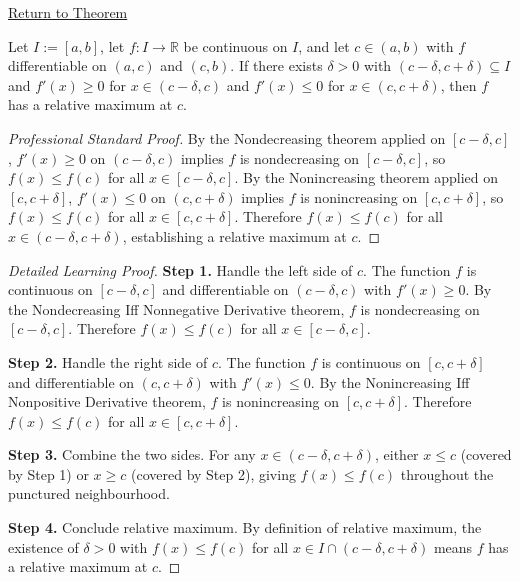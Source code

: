 \newpage
{}
\label{prf:first-derivative-test-maximum}

\begin{remark*}[Return]
\hyperref[thm:first-derivative-test-maximum]{Return to Theorem}
\end{remark*}

\begin{theorem*}
Let $I := [a,b]$, let $f : I \to \mathbb{R}$ be continuous on $I$, and let $c \in (a,b)$ with $f$ differentiable on $(a,c)$ and $(c,b)$. If there exists $\delta > 0$ with $(c-\delta,c+\delta) \subseteq I$ and $f'(x) \geq 0$ for $x \in (c-\delta,c)$ and $f'(x) \leq 0$ for $x \in (c,c+\delta)$, then $f$ has a relative maximum at $c$.
\end{theorem*}

\begin{proof}[Professional Standard Proof]
\LRAProofBodyStart
By the Nondecreasing theorem applied on $[c-\delta, c]$, $f'(x) \geq 0$ on $(c-\delta,c)$ implies $f$ is nondecreasing on $[c-\delta,c]$, so $f(x) \leq f(c)$ for all $x \in [c-\delta,c]$. By the Nonincreasing theorem applied on $[c,c+\delta]$, $f'(x) \leq 0$ on $(c,c+\delta)$ implies $f$ is nonincreasing on $[c,c+\delta]$, so $f(x) \leq f(c)$ for all $x \in [c,c+\delta]$. Therefore $f(x) \leq f(c)$ for all $x \in (c-\delta,c+\delta)$, establishing a relative maximum at $c$.
\end{proof}

\begin{proof}[Detailed Learning Proof]
\LRAProofBodyStart

\textbf{Step 1.} Handle the left side of $c$. The function $f$ is continuous on $[c-\delta,c]$ and differentiable on $(c-\delta,c)$ with $f'(x) \geq 0$. By the Nondecreasing Iff Nonneg\-ative Derivative theorem, $f$ is nondecreasing on $[c-\delta,c]$. Therefore $f(x) \leq f(c)$ for all $x \in [c-\delta,c]$.

\textbf{Step 2.} Handle the right side of $c$. The function $f$ is continuous on $[c,c+\delta]$ and differentiable on $(c,c+\delta)$ with $f'(x) \leq 0$. By the Nonincreasing Iff Nonpos\-itive Derivative theorem, $f$ is nonincreasing on $[c,c+\delta]$. Therefore $f(x) \leq f(c)$ for all $x \in [c,c+\delta]$.

\textbf{Step 3.} Combine the two sides. For any $x \in (c-\delta,c+\delta)$, either $x \leq c$ (covered by Step 1) or $x \geq c$ (covered by Step 2), giving $f(x) \leq f(c)$ throughout the punctured neighbourhood.

\textbf{Step 4.} Conclude relative maximum. By definition of relative maximum, the existence of $\delta > 0$ with $f(x) \leq f(c)$ for all $x \in I \cap (c-\delta,c+\delta)$ means $f$ has a relative maximum at $c$.
\end{proof}

